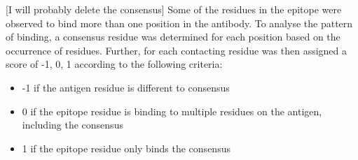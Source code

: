 \documentclass{article}
\begin{document}
[I will probably delete the consensus]
Some of the residues in the epitope were observed to bind more than one position in the antibody. To analyse the pattern of binding, a consensus residue was determined for each position based on the occurrence of residues. Further, for each contacting residue was then assigned a score  of  -1, 0, 1 according to the following criteria:
\begin{itemize}
	\item -1 if the antigen residue is different to consensus 
	\item  0 if the epitope residue is binding to multiple residues on the antigen, including the consensus
	\item 1 if the epitope residue only binds the consensus
	
\end{itemize}



\end{document}
